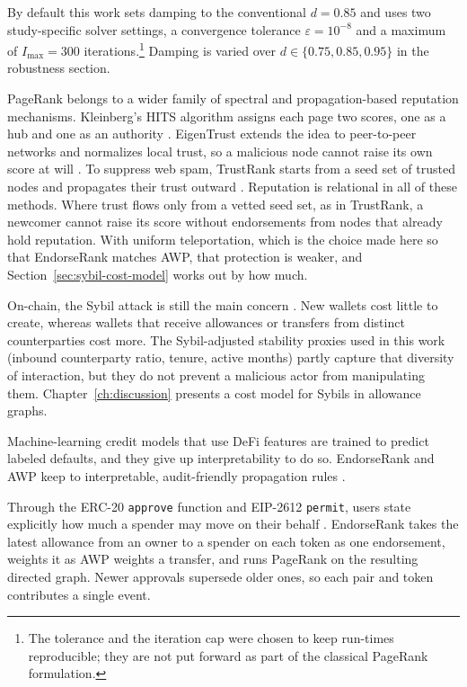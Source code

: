 By default this work sets damping to the conventional $d=0.85$  and uses two study-specific solver settings, a convergence tolerance $\varepsilon=10^{-8}$ and a maximum of $I_{\max}=300$ iterations.\footnote{The tolerance and the iteration cap were chosen to keep run-times reproducible; they are not put forward as part of the classical PageRank formulation.} Damping is varied over $d\in\{0.75,0.85,0.95\}$ in the robustness section.


PageRank belongs to a wider family of spectral and propagation-based reputation mechanisms. Kleinberg's HITS algorithm assigns each page two scores, one as a hub and one as an authority . EigenTrust extends the idea to peer-to-peer networks and normalizes local trust, so a malicious node cannot raise its own score at will . To suppress web spam, TrustRank starts from a seed set of trusted nodes and propagates their trust outward . Reputation is relational in all of these methods. Where trust flows only from a vetted seed set, as in TrustRank, a newcomer cannot raise its score without endorsements from nodes that already hold reputation. With uniform teleportation, which is the choice made here so that EndorseRank matches AWP, that protection is weaker, and Section~\ref{sec:sybil-cost-model} works out by how much.

On-chain, the Sybil attack is still the main concern . New wallets cost little to create, whereas wallets that receive allowances or transfers from distinct counterparties cost more. The Sybil-adjusted stability proxies used in this work (inbound counterparty ratio, tenure, active months) partly capture that diversity of interaction, but they do not prevent a malicious actor from manipulating them. Chapter~\ref{ch:discussion} presents a cost model for Sybils in allowance graphs.

Machine-learning credit models that use DeFi features  are trained to predict labeled defaults, and they give up interpretability to do so. EndorseRank and AWP keep to interpretable, audit-friendly propagation rules .


Through the ERC-20 \texttt{approve} function and EIP-2612 \texttt{permit}, users state explicitly how much a spender may move on their behalf . EndorseRank takes the latest allowance from an owner to a spender on each token as one endorsement, weights it as AWP weights a transfer, and runs PageRank on the resulting directed graph. Newer approvals supersede older ones, so each pair and token contributes a single event.

